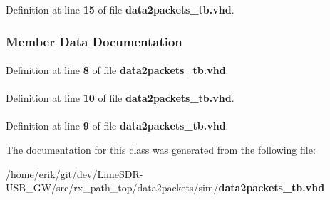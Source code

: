 Definition at line {\bf 15} of file {\bf data2packets\+\_\+tb.\+vhd}.



\subsubsection{Member Data Documentation}
\paragraph[{ieee}]{\hspace{0.3cm}{\ttfamily [Library]}}\label{classdata2packets__tb_a0a6af6eef40212dbaf130d57ce711256}


Definition at line {\bf 8} of file {\bf data2packets\+\_\+tb.\+vhd}.

\paragraph[{numeric\+\_\+std}]{\hspace{0.3cm}{\ttfamily [Package]}}\label{classdata2packets__tb_a2edc34402b573437d5f25fa90ba4013e}


Definition at line {\bf 10} of file {\bf data2packets\+\_\+tb.\+vhd}.

\paragraph[{std\+\_\+logic\+\_\+1164}]{\hspace{0.3cm}{\ttfamily [Package]}}\label{classdata2packets__tb_acd03516902501cd1c7296a98e22c6fcb}


Definition at line {\bf 9} of file {\bf data2packets\+\_\+tb.\+vhd}.



The documentation for this class was generated from the following file\+:\begin{DoxyCompactItemize}
\item 
/home/erik/git/dev/\+Lime\+S\+D\+R-\/\+U\+S\+B\+\_\+\+G\+W/src/rx\+\_\+path\+\_\+top/data2packets/sim/{\bf data2packets\+\_\+tb.\+vhd}\end{DoxyCompactItemize}
